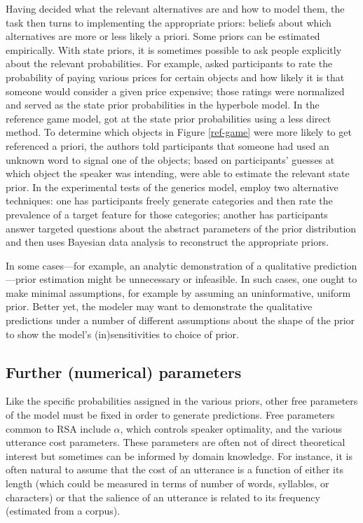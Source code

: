 \documentclass{sp}
\begin{document}
Having decided what the relevant alternatives are and how to model them, the task then turns to implementing the appropriate priors: beliefs about which alternatives are more or less likely a priori. Some priors can be estimated empirically. With state priors, it is sometimes possible to ask people explicitly about the relevant probabilities. For example, \cite{kaoetal2014} asked participants to rate the probability of paying various prices for certain objects and how likely it is that someone would consider a given price expensive; those ratings were normalized and served as the state prior probabilities in the hyperbole model. In the reference game model, \cite{frankgoodman2012} got at the state prior probabilities using a less direct method. To determine which objects in Figure \ref{ref-game} were more likely to get referenced a priori, the authors told participants that someone had used an unknown word to signal one of the objects; based on participants' guesses at which object the speaker was intending, \citeauthor{frankgoodman2012} were able to estimate the relevant state prior.
In the experimental tests of the generics model, \cite{tesslergoodman2019} employ two alternative techniques: one has participants freely generate categories and then rate the prevalence of a target feature for those categories; another has participants answer targeted questions about the abstract parameters of the prior distribution and then uses Bayesian data analysis to reconstruct the appropriate priors. 

In some cases---for example, an analytic demonstration of a qualitative prediction---prior estimation might be unnecessary or infeasible. In such cases, one ought to make minimal assumptions, for example by assuming an uninformative, uniform prior. Better yet, the modeler may want to demonstrate the qualitative predictions under a number of different assumptions about the shape of the prior to show the model's (in)sensitivities to choice of prior.

\subsection{Further (numerical) parameters}

Like the specific probabilities assigned in the various priors, other free parameters of the model must be fixed in order to generate predictions. Free parameters common to RSA include $\alpha$, which controls speaker optimality, and the various utterance cost parameters. These parameters are often not of direct theoretical interest but sometimes can be informed by domain knowledge. For instance, it is often natural to assume that the cost of an utterance is a function of either its length  (which could be measured in terms of number of words, syllables, or characters) or that the salience of an utterance is related to its frequency (estimated from a corpus).
\end{document}
